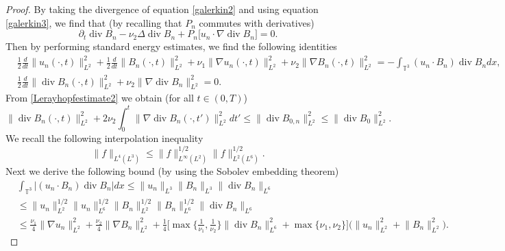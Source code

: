 \documentclass[12pt,a4paper]{article}
\theoremstyle{definition}
\theoremstyle{remark}
\numberwithin{equation}{section}
\DeclareMathOperator{\Div}{div}
\begin{document}
\begin{proof}
By taking the divergence of equation \eqref{galerkin2} and using equation \eqref{galerkin3}, we find that (by recalling that $P_n$ commutes with derivatives)
\begin{equation*}
\partial_t \Div B_n - \nu_2 \Delta \Div B_n + P_n \big[ u_n \cdot \nabla \Div B_n \big] = 0.
\end{equation*}
Then by performing standard energy estimates, we find the following identities 
\begin{align}
&\frac{1}{2} \frac{d}{dt} \lVert u_n (\cdot, t) \rVert_{L^2}^2 + \frac{1}{2} \frac{d}{d t} \lVert B_n (\cdot, t) \rVert_{L^2}^2 + \nu_1 \lVert \nabla u_n (\cdot, t) \rVert_{L^2}^2 + \nu_2 \lVert \nabla B_n (\cdot, t) \rVert_{L^2}^2 = - \int_{\mathbb{T}^3} (u_n \cdot B_n) \Div B_n  dx, \label{Lerayhopfestimate} \\
&\frac{1}{2} \frac{d}{d t} \lVert \Div B_n (\cdot, t) \rVert_{L^2}^2 + \nu_2 \lVert \nabla \Div B_n \rVert_{L^2}^2 = 0. \label{Lerayhopfestimate2}
\end{align}
From \eqref{Lerayhopfestimate2} we obtain (for all $t \in (0,T)$)
\begin{equation} \label{divBenergyestimate}
\lVert \Div B_n ( \cdot, t) \rVert_{L^2}^2 + 2 \nu_2 \int_0^t \lVert \nabla \Div B_n (\cdot, t') \rVert_{L^2}^2 dt' \leq \lVert \Div B_{0,n} \rVert_{L^2}^2 \leq \lVert \Div B_0 \rVert_{L^2}^2.
\end{equation}
We recall the following interpolation inequality
\begin{equation} \label{interpolationinequality}
\lVert f \rVert_{L^4 (L^3)} \leq \lVert f \rVert_{L^\infty (L^2)}^{1/2} \lVert f \rVert_{L^2 (L^6)}^{1/2}.
\end{equation}
Next we derive the following bound (by using the Sobolev embedding theorem)
\begin{align*}
&\int_{\mathbb{T}^3} \left\lvert (u_n \cdot B_n) \Div B_n \right\rvert  dx \leq \lVert u_n \rVert_{L^3} \lVert B_n \rVert_{L^3} \lVert \Div B_n \rVert_{L^6} \\
&\leq \lVert u_n \rVert_{L^2}^{1/2} \lVert u_n \rVert_{L^6}^{1/2} \lVert B_n \rVert_{L^2}^{1/2} \lVert B_n \rVert_{L^6}^{1/2} \lVert \Div B_n \rVert_{L^6} \\
&\leq \frac{\nu_1}{4} \lVert \nabla u_n \rVert_{L^2}^2 + \frac{\nu_2}{4} \lVert \nabla B_n \rVert_{L^2}^2 + \frac{1}{4} \bigg[ \max \bigg\{ \frac{1}{\nu_1}, \frac{1}{\nu_2} \bigg\} \lVert \Div B_n \rVert_{L^6}^2 + \max \{ \nu_1, \nu_2 \} \bigg] \bigg( \lVert u_n \rVert_{L^2}^2 + \lVert B_n \rVert_{L^2}^2 \bigg).
\end{align*}

\end{proof}
\end{document}
